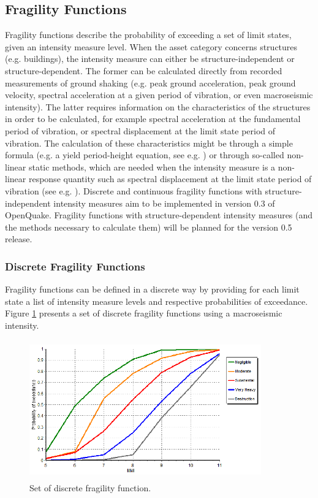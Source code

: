 \subsection{Fragility Functions}
Fragility functions describe the probability of exceeding a set of limit states, given an intensity measure level. When the asset category concerns structures (e.g. buildings), the intensity measure can either be structure-independent or structure-dependent. The former can be calculated directly from recorded measurements of ground shaking (e.g. peak ground acceleration, peak ground velocity, spectral acceleration at a given period of vibration, or even macroseismic intensity). The latter requires information on the characteristics of the structures in order to be calculated, for example spectral acceleration at the fundamental period of vibration, or spectral displacement at the limit state period of vibration. The calculation of these characteristics might be through a simple formula (e.g. a yield period-height equation, see e.g. \citet{CrowleyPinho2004} ) or through so-called non-linear static methods, which are needed when the intensity measure is a non-linear response quantity such as spectral displacement at the limit state period of vibration (see e.g. \citet{FEMA440ATC2005}).
Discrete and continuous fragility functions with structure-independent intensity measures aim to be implemented in version 0.3 of OpenQuake. Fragility functions with structure-dependent intensity measures (and the methods necessary to calculate them) will be planned for the version 0.5 release.

\subsubsection{Discrete Fragility Functions}
Fragility functions can be defined in a discrete way by providing for each limit state a list of intensity measure levels and respective probabilities of exceedance. Figure \ref{fig:FFDiscrete} presents a set of discrete fragility functions using a macroseismic intensity.

\begin{figure}[ht]
\centering
\includegraphics[width=10cm,height=6cm]{./Figures/Part_Risk/FFDiscrete.eps}
\caption{Set of discrete fragility function.}
\label{fig:FFDiscrete}
\end{figure}

